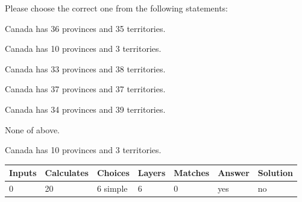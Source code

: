 \documentclass[12pt]{article}
\begin{document}
  
Please choose the correct one from the following statements:
 
 
Canada has  %
36 provinces and  %
35 territories.
 
 
Canada has  %
10 provinces and  %
3 territories.
 
 
Canada has  %
33 provinces and  %
38 territories.
 
 
Canada has  %
37 provinces and  %
37 territories.
 
 
Canada has  %
34 provinces and  %
39 territories.
 
 
 None of above.
 
 
\noindent{}
 
 
Canada has  %
10 provinces and  %
3 territories.
 
 
\noindent{}
 
 
   
   
   
   
\noindent\begin{tabular}{|l|l|l|l|l|l|l|}
 \hline
Inputs & Calculates & Choices & Layers & Matches & Answer & Solution \\ \hline
           0  & 
          20  & 
           6
  simple  
  & 
           6  & 
           0  & 
  yes & 
  no 
  \\ \hline
 \end{tabular}
   
   
   
   
\noindent{}
   
   
  
\end{document}
